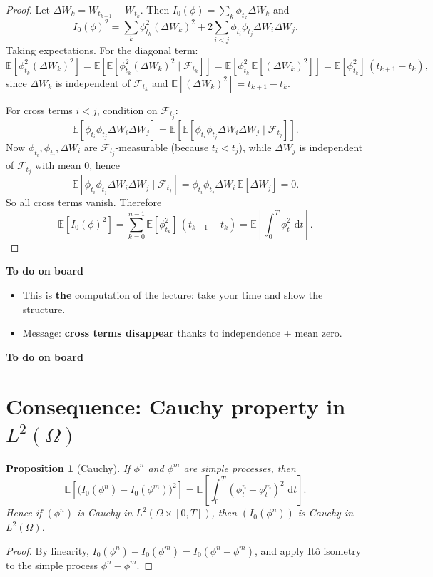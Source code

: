 \documentclass[11pt]{article}
\newcommand{\E}{\mathbb{E}}
\newcommand{\F}{\mathcal{F}}
\newcommand{\1}{\mathbf{1}}
\newcommand{\dd}{\,\mathrm{d}}
\numberwithin{equation}{section}
\theoremstyle{plain}
\newtheorem{proposition}[theorem]{Proposition}
\theoremstyle{definition}
\theoremstyle{remark}
\begin{document}
\begin{proof}
Let $\Delta W_k=W_{t_{k+1}}-W_{t_k}$. Then $I_0(\phi)=\sum_k \phi_{t_k}\Delta W_k$ and
\[
I_0(\phi)^2=\sum_k \phi_{t_k}^2(\Delta W_k)^2
+2\sum_{i<j}\phi_{t_i}\phi_{t_j}\Delta W_i\Delta W_j.
\]
Taking expectations. For the diagonal term:
\[
\E\!\left[\phi_{t_k}^2(\Delta W_k)^2\right]
=\E\!\left[\E\!\left[\phi_{t_k}^2(\Delta W_k)^2\mid \F_{t_k}\right]\right]
=\E\!\left[\phi_{t_k}^2\,\E[(\Delta W_k)^2]\right]
=\E[\phi_{t_k}^2]\,(t_{k+1}-t_k),
\]
since $\Delta W_k$ is independent of $\F_{t_k}$ and $\E[(\Delta W_k)^2]=t_{k+1}-t_k$.

For cross terms $i<j$, condition on $\F_{t_j}$:
\[
\E[\phi_{t_i}\phi_{t_j}\Delta W_i\Delta W_j]
=\E\!\left[\E[\phi_{t_i}\phi_{t_j}\Delta W_i\Delta W_j\mid \F_{t_j}]\right].
\]
Now $\phi_{t_i},\phi_{t_j},\Delta W_i$ are $\F_{t_j}$-measurable (because $t_i<t_j$),
while $\Delta W_j$ is independent of $\F_{t_j}$ with mean $0$, hence
\[
\E[\phi_{t_i}\phi_{t_j}\Delta W_i\Delta W_j\mid \F_{t_j}]
=\phi_{t_i}\phi_{t_j}\Delta W_i\,\E[\Delta W_j]=0.
\]
So all cross terms vanish. Therefore
\[
\E[I_0(\phi)^2]=\sum_{k=0}^{n-1}\E[\phi_{t_k}^2]\,(t_{k+1}-t_k)
=\E\!\left[\int_0^T \phi_t^2\,\dd t\right].
\]
\end{proof}

\textbf{To do on board}
\begin{itemize}
  \item This is \textbf{the} computation of the lecture: take your time and show the structure.
  \item Message: \textbf{cross terms disappear} thanks to independence + mean zero.
\end{itemize}
\textbf{To do on board}

\section{Consequence: Cauchy property in $L^2(\Omega)$}

\begin{proposition}[Cauchy]
If $\phi^n$ and $\phi^m$ are simple processes, then
\[
\E\!\left[\big(I_0(\phi^n)-I_0(\phi^m)\big)^2\right]
=\E\!\left[\int_0^T (\phi_t^n-\phi_t^m)^2\,\dd t\right].
\]
Hence if $(\phi^n)$ is Cauchy in $L^2(\Omega\times[0,T])$, then $(I_0(\phi^n))$ is Cauchy in $L^2(\Omega)$.
\end{proposition}

\begin{proof}
By linearity,
$I_0(\phi^n)-I_0(\phi^m)=I_0(\phi^n-\phi^m)$, and apply It\^o isometry to the simple process $\phi^n-\phi^m$.
\end{proof}
\end{document}
